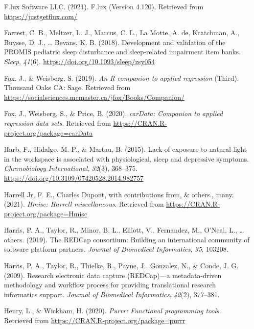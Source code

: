\documentclass[
  english,
  man]{apa6}
\newlength{\cslhangindent}
\newlength{\cslentryspacingunit} %
\newenvironment{CSLReferences}[2] %
 {%
  \setlength{\parindent}{0pt}
  \ifodd #1
  \let\oldpar\par
  \def\par{\hangindent=\cslhangindent\oldpar}
  \fi
  \setlength{\parskip}{#2\cslentryspacingunit}
 }%
 {}
\begin{document}
\begin{CSLReferences}{1}{0}
\leavevmode{}%
F.lux Software LLC. (2021). F.lux (Version 4.120). Retrieved from \url{https://justgetflux.com/}

\leavevmode{}%
Forrest, C. B., Meltzer, L. J., Marcus, C. L., La Motte, A. de, Kratchman, A., Buysse, D. J., \ldots{} Bevans, K. B. (2018). Development and validation of the PROMIS pediatric sleep disturbance and sleep-related impairment item banks. \emph{Sleep}, \emph{41}(6). \url{https://doi.org/10.1093/sleep/zsy054}

\leavevmode{}%
Fox, J., \& Weisberg, S. (2019). \emph{An {R} companion to applied regression} (Third). Thousand Oaks {CA}: Sage. Retrieved from \url{https://socialsciences.mcmaster.ca/jfox/Books/Companion/}

\leavevmode{}%
Fox, J., Weisberg, S., \& Price, B. (2020). \emph{carData: Companion to applied regression data sets}. Retrieved from \url{https://CRAN.R-project.org/package=carData}

\leavevmode{}%
Harb, F., Hidalgo, M. P., \& Martau, B. (2015). Lack of exposure to natural light in the workspace is associated with physiological, sleep and depressive symptoms. \emph{Chronobiology International}, \emph{32}(3), 368--375. \url{https://doi.org/10.3109/07420528.2014.982757}

\leavevmode{}%
Harrell Jr, F. E., Charles Dupont, with contributions from, \& others., many. (2021). \emph{Hmisc: Harrell miscellaneous}. Retrieved from \url{https://CRAN.R-project.org/package=Hmisc}

\leavevmode{}%
Harris, P. A., Taylor, R., Minor, B. L., Elliott, V., Fernandez, M., O'Neal, L., \ldots{} others. (2019). The REDCap consortium: Building an international community of software platform partners. \emph{Journal of Biomedical Informatics}, \emph{95}, 103208.

\leavevmode{}%
Harris, P. A., Taylor, R., Thielke, R., Payne, J., Gonzalez, N., \& Conde, J. G. (2009). Research electronic data capture (REDCap)---a metadata-driven methodology and workflow process for providing translational research informatics support. \emph{Journal of Biomedical Informatics}, \emph{42}(2), 377--381.

\leavevmode{}%
Henry, L., \& Wickham, H. (2020). \emph{Purrr: Functional programming tools}. Retrieved from \url{https://CRAN.R-project.org/package=purrr}


\end{CSLReferences}
\end{document}
